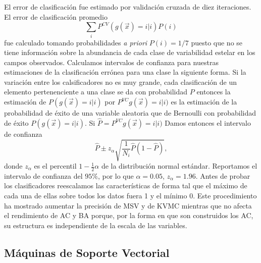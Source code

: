 \documentclass[letterpaper,12pt]{book}
\begin{document}
El error de clasificación fue estimado por validación cruzada de diez iteraciones. El error de clasificación promedio 
\begin{equation}
\sum_{i}P^{CV}(g(\vec{x}) = i | i)P(i)
\end{equation} 
fue calculado tomando probabilidades \textit{a priori} $P(i) = 1/7$ puesto que no se tiene información sobre la abundancia de cada clase de variabilidad estelar en los campos observados. Calculamos intervalos de confianza para nuestras estimaciones de la clasificación errónea para una clase la siguiente forma. Si la variación entre los calsificadores no es muy grande, cada clasificación de un elemento pertenenciente a una clase se da con probabilidad $P$ entonces la estimación de $P(g(\vec{x})=i|i)$ por $P^{VC}g(\vec{x})=i|i)$ es la estimación de la probabilidad de éxito de una variable aleatoria que de Bernoulli con probabilidad de éxito $P(g(\vec{x})=i|i)$. Si $\hat{P} = P^{VC}g(\vec{x})=i|i)$ Damos entonces el intervalo de confianza
\begin{equation}
  \hat{P} \pm z_{\alpha} \sqrt{\frac{1}{N_i} \hat{P}(1-\hat{P})},
\end{equation}
donde $z_\alpha$ es el percentil $1-\frac{1}{2}\alpha$ de la distribución normal estándar. Reportamos el intervalo de confianza del $95\%$, por lo que $\alpha = 0.05$, $z_\alpha = 1.96$. 
Antes de probar los clasificadores reescalamos las características de forma tal que el máximo de cada una de ellas sobre todos los datos fuera 1 y el mínimo 0. Este procedimiento ha mostrado aumentar la precisión de MSV y de KVMC mientras que no afecta el rendimiento de AC y BA porque, por la forma en que son construidos los AC, su estructura es independiente de la escala de las variables. 

\subsection{Máquinas de Soporte Vectorial}
\end{document}
